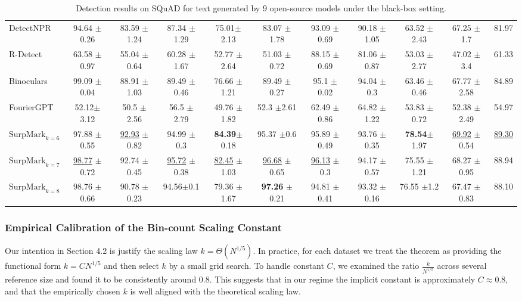\documentclass{article}
\newcommand{\com}[1]{\tiny$\pm$#1}
\theoremstyle{plain}
\theoremstyle{definition}
\theoremstyle{remark}
\begin{document}
\begin{table}[htbp]
{{\begin{tabular}{lcccccccccc}
DetectNPR & 94.64 \com 0.26 & 83.59 \com 1.24& 87.34 \com 1.29& 75.01\com 2.13  & 83.07 \com 1.78 & 93.09 \com 0.69 & 90.18 \com 1.05 & 63.52 \com 2.43 & 67.25 \com 1.7 & 81.97 \\

R-Detect & 63.58 \com 0.97 & 55.04 \com 0.64 & 60.28 \com 1.67 & 52.77 \com 2.64 &  51.03 \com 0.72 & 88.15 \com 0.69 &  81.06 \com 0.87 & 53.03 \com 2.77 & 47.02 \com 3.4 & 61.33 \\

Binoculars & 99.09 \com 0.04 & 88.91 \com 1.03 &  89.49 \com 0.46 & 76.66 \com 1.21 & 89.49 \com 0.27 & 95.1 \com 0.02 & 94.04  \com 0.3& 63.46  \com 0.46 & 67.77 \com 2.58 & 84.89\\

FourierGPT &  52.12\com 3.12 & 50.5 \com 2.56 & 56.5 \com 2.79 & 49.76 \com 1.82 &  52.3 \com 2.61 & 62.49 \com 0.86 &  64.82 \com 1.22& 53.83 \com 0.72 & 52.38 \com 2.49 & 54.97 \\

\rowcolor{ours}$\text{SurpMark}_{k=6}$ & 97.88 \com 0.55 & \underline{92.93} \com 0.82  & 94.99 \com 0.3 & \textbf{84.39}\com 0.18 & 95.37 \com 0.6 & 95.89 \com 0.49 & 93.76 \com 0.35 & \textbf{78.54}\com 1.97 & \underline{69.92} \com 0.54 & \underline{89.30} \\

\rowcolor{ours}$\text{SurpMark}_{k=7}$ & \underline{98.77} \com 0.72 & 92.74 \com 0.45 & \underline{95.72} \com 0.38 & \underline{82.45} \com 1.03 & \underline{96.68} \com 0.65 & \underline{96.13} \com 0.3 & 94.17 \com 0.57 & 75.55 \com 1.21 & 68.27 \com 0.95 & 88.94 \\

\rowcolor{ours}$\text{SurpMark}_{k=8}$ & 98.76 \com 0.66 & 90.78 \com 0.23 & 94.56\com 0.1 & 79.36 \com 1.67 & \textbf{97.26} \com 0.21 & 94.81 \com 0.41 & 93.32 \com 0.16& 76.55 \com 1.2 & 67.47 \com 0.83 & 88.10 \\
\bottomrule
\end{tabular}}}
\caption{Detection results on SQuAD for text generated by 9 open-source models under the black-box setting.}
\label{tab:opensource-squad}
\end{table}
\newpage 
\subsubsection{Empirical Calibration of the Bin-count Scaling Constant}\label{app:choice-of-k}

Our intention in Section 4.2 is justify the scaling law $k=\Theta(N^{1/5})$. In practice, for each dataset we treat the theorem as providing the functional form $k=CN^{1/5}$ and then select $k$ by a small grid search. To handle constant $C$, we examined the ratio $\frac{k}{N^{1/5}}$ across several reference size and found it to be consistently around 0.8. This suggests that in our regime the implicit constant is approximately $C \approx 0.8$, and that the empirically chosen $k$ is well aligned with the theoretical scaling law.
\end{document}
